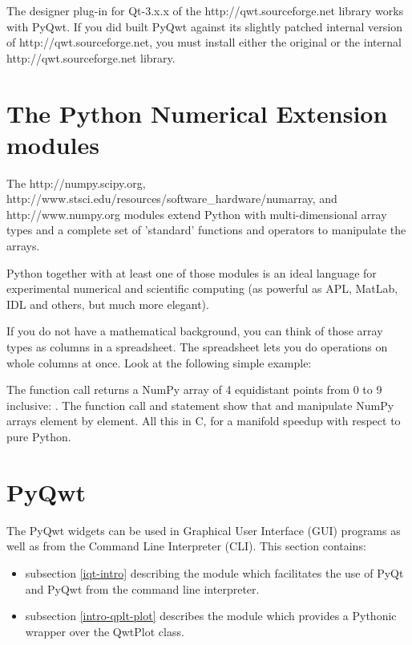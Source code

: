 \documentclass{manual}
\newcommand{\Qwt}{\ulink{Qwt}
  {http://qwt.sourceforge.net}}
\newcommand{\Download}{\ulink{download}
  {http://pyqwt.sourceforge.net/download.html}}
\newcommand{\NumPy}{\ulink{NumPy}
  {http://numpy.scipy.org}}
\newcommand{\numarray}{\ulink{numarray}
  {http://www.stsci.edu/resources/software_hardware/numarray}}
\newcommand{\Numeric}{\ulink{Numeric}
  {http://www.numpy.org}}
\newcommand{\Future}{
  \begin{notice}[warning]
    The documentation is for the future PyQwt-4.2.2 which is only available
    from CVS. The \Download{} page has links for the latest releases.
  \end{notice}
}
\renewcommand{\Future}{}
\begin{document}
\begin{notice}[note]
  The designer plug-in for Qt-3.x.x of the \Qwt{} library works with PyQwt.
  If you did built PyQwt against its slightly patched internal version of
  \Qwt{}, you must install either the original or the internal \Qwt{} library.
\end{notice}


\section{The Python Numerical Extension modules \label{numeric-intro}}

\Future{}

The \NumPy{}, \numarray{}, and \Numeric{} modules extend Python with
multi-dimensional array types and a complete set of 'standard' functions
and operators to manipulate the arrays.

Python together with at least one of those modules is an ideal language for
experimental numerical and scientific computing (as powerful as APL, MatLab,
IDL and others, but much more elegant).

If you do not have a mathematical background, you can think of those array
types as columns in a spreadsheet.  The spreadsheet lets you do operations
on whole columns at once.  Look at the following simple example:



The function call  returns a NumPy array of 4
equidistant points from 0 to 9 inclusive: .
The function call  and statement  show that
 and \samp{*} manipulate NumPy arrays element by element.
All this in C, for a manifold speedup with respect to pure Python.


\section{PyQwt
  \label{pyqwt-intro}}

\Future{}

The PyQwt widgets can be used in Graphical User Interface (GUI)
programs as well as from the Command Line Interpreter (CLI).
This section contains:
\begin{itemize}
\item
  subsection \ref{iqt-intro} describing the module  which
  facilitates the use of PyQt and PyQwt from the command line interpreter.
\item
  subsection \ref{intro-qplt-plot} describes the module 
  which provides a Pythonic wrapper over the QwtPlot class.
\end{itemize}
\end{document}
